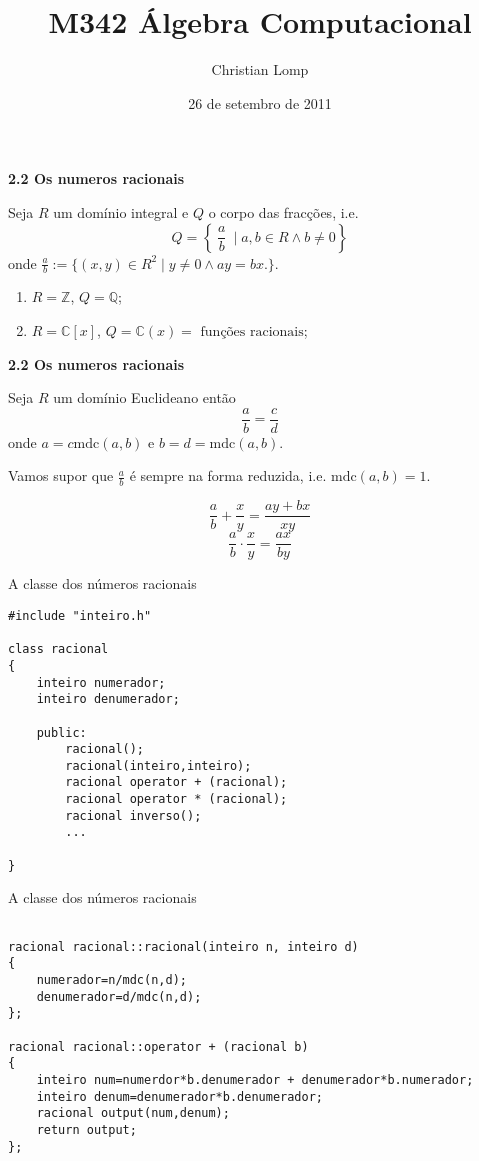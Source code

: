 \documentclass[handout]{beamer}
\title[M342]{M342 Álgebra Computacional}
\author{Christian Lomp}
\institute{FCUP}
\date{26 de setembro de 2011}
\newcommand{\ZZ}{\mathbb Z}
\newcommand{\CC}{\mathbb C}
\newcommand{\QQ}{\mathbb Q}
\newcommand{\mdc}[2]{\mathrm{mdc}({#1}, {#2})}
\begin{document}
\begin{frame}
\titlepage
\end{frame}






\begin{frame}{\bf 2.2 Os numeros racionais} 

Seja $R$ um domínio integral e $Q$ o corpo das fracções, i.e.
$$Q= \left\{ \: \frac{a}{b} \: \mid a,b\in R \wedge b\neq 0 \right\}$$
onde $\frac{a}{b} := \{ (x,y) \in R^2 \mid y\neq 0 \wedge ay=bx.\}$.
\pause

\begin{enumerate}
\item $R=\ZZ$, $Q=\QQ$;
\item $R=\CC[x]$, $Q=\CC(x) = \mbox{ funções racionais}$;
\end{enumerate}
\end{frame}

\begin{frame}{\bf 2.2 Os numeros racionais} 

Seja $R$ um domínio Euclideano então 
$$ \frac{a}{b} = \frac{c}{d}$$
onde $a=c\mdc{a}{b}$ e $b=d=\mdc{a}{b}.$

Vamos supor que $\frac{a}{b}$ é sempre na forma reduzida, i.e. $\mdc{a}{b}=1$.
\pause

$$\frac{a}{b} + \frac{x}{y} = \frac{ay+bx}{xy}$$
$$\frac{a}{b} \cdot \frac{x}{y} = \frac{ax}{by}$$


\end{frame}

\begin{frame}[fragile]{A classe dos números racionais}
\lstset{language=C++}
\begin{lstlisting}
#include "inteiro.h"

class racional
{
	inteiro numerador;
	inteiro denumerador;
	
	public: 
		racional();
		racional(inteiro,inteiro);
		racional operator + (racional);
		racional operator * (racional);
		racional inverso();
		...
	
}
\end{lstlisting}
\end{frame}



\begin{frame}[fragile]{A classe dos números racionais}
\lstset{language=C++}
\begin{lstlisting}

racional racional::racional(inteiro n, inteiro d)
{
	numerador=n/mdc(n,d);
	denumerador=d/mdc(n,d);
};

racional racional::operator + (racional b)
{
	inteiro num=numerdor*b.denumerador + denumerador*b.numerador;
	inteiro denum=denumerador*b.denumerador;
	racional output(num,denum);
	return output;
};


\end{lstlisting}
\end{frame}
\end{document}
